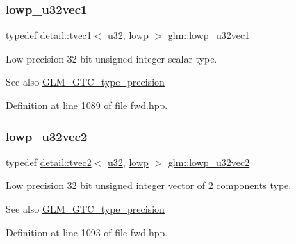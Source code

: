 \subsubsection{\texorpdfstring{lowp\+\_\+u32vec1}{lowp\_u32vec1}}
{\footnotesize\ttfamily typedef \hyperlink{structglm_1_1detail_1_1tvec1}{detail\+::tvec1}$<$ \hyperlink{group__gtc__type__precision_ga54e837745059fd29017bed71cfa0a8db}{u32}, \hyperlink{namespaceglm_a0f04f086094c747d227af4425893f545ae161af3fc695e696ce3bf69f7332bc2d}{lowp} $>$ \hyperlink{group__gtc__type__precision_ga579d71c2ae1225b689aaab0bc7d33146}{glm\+::lowp\+\_\+u32vec1}}

Low precision 32 bit unsigned integer scalar type. \begin{DoxySeeAlso}{See also}
\hyperlink{group__gtc__type__precision}{G\+L\+M\+\_\+\+G\+T\+C\+\_\+type\+\_\+precision} 
\end{DoxySeeAlso}


Definition at line 1089 of file fwd.\+hpp.

\mbox{\label{group__gtc__type__precision_ga2f588e15c609987b89bd03f50b2a492d}} 
\subsubsection{\texorpdfstring{lowp\+\_\+u32vec2}{lowp\_u32vec2}}
{\footnotesize\ttfamily typedef \hyperlink{structglm_1_1detail_1_1tvec2}{detail\+::tvec2}$<$ \hyperlink{group__gtc__type__precision_ga54e837745059fd29017bed71cfa0a8db}{u32}, \hyperlink{namespaceglm_a0f04f086094c747d227af4425893f545ae161af3fc695e696ce3bf69f7332bc2d}{lowp} $>$ \hyperlink{group__gtc__type__precision_ga2f588e15c609987b89bd03f50b2a492d}{glm\+::lowp\+\_\+u32vec2}}

Low precision 32 bit unsigned integer vector of 2 components type. \begin{DoxySeeAlso}{See also}
\hyperlink{group__gtc__type__precision}{G\+L\+M\+\_\+\+G\+T\+C\+\_\+type\+\_\+precision} 
\end{DoxySeeAlso}


Definition at line 1093 of file fwd.\+hpp.

\mbox{\label{group__gtc__type__precision_ga53b6133cd2491fce1445c1744556b1bb}} 
